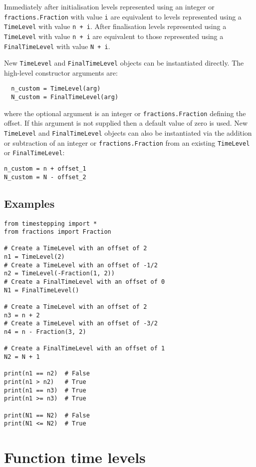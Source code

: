 \documentclass[a4paper]{book}
\begin{document}
Immediately after initialisation levels represented using an integer or
\linebreak \verb+fractions.Fraction+ with value \verb+i+ are equivalent to
levels represented using a \verb+TimeLevel+ with value \verb=n + i=. After
finalisation levels represented using a \verb+TimeLevel+ with value \verb=n + i=
are equivalent to those represented using a \linebreak \verb+FinalTimeLevel+
with value \verb=N + i=.

New \verb+TimeLevel+ and \verb+FinalTimeLevel+ objects can be instantiated
directly. The high-level constructor arguments are:
\begin{lstlisting}
  n_custom = TimeLevel(arg)
  N_custom = FinalTimeLevel(arg)
\end{lstlisting}
where the optional argument is an integer or \verb+fractions.Fraction+ defining
the offset. If this argument is not supplied then a default value of zero is
used. New \verb+TimeLevel+ and \verb+FinalTimeLevel+ objects can also be
instantiated via the addition or subtraction of an integer or
\verb+fractions.Fraction+ from an existing \verb+TimeLevel+ or
\verb+FinalTimeLevel+:
\begin{lstlisting}
n_custom = n + offset_1
N_custom = N - offset_2
\end{lstlisting}

\subsection*{Examples}
\begin{lstlisting}
from timestepping import *
from fractions import Fraction

# Create a TimeLevel with an offset of 2
n1 = TimeLevel(2)
# Create a TimeLevel with an offset of -1/2
n2 = TimeLevel(-Fraction(1, 2))
# Create a FinalTimeLevel with an offset of 0
N1 = FinalTimeLevel()

# Create a TimeLevel with an offset of 2
n3 = n + 2
# Create a TimeLevel with an offset of -3/2
n4 = n - Fraction(3, 2)

# Create a FinalTimeLevel with an offset of 1
N2 = N + 1

print(n1 == n2)  # False
print(n1 > n2)   # True
print(n1 == n3)  # True
print(n1 >= n3)  # True

print(N1 == N2)  # False
print(N1 <= N2)  # True
\end{lstlisting}

\section{Function time levels}
\end{document}
